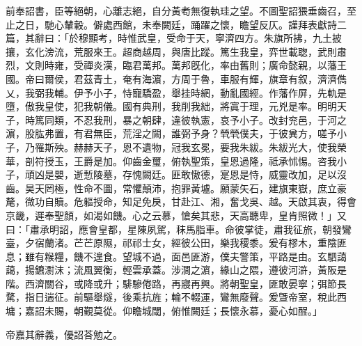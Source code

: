 \begin{pinyinscope}
前奉詔書，臣等絕朝，心離志絕，自分黃耇無復執珪之望。不圖聖詔猥垂齒召，至止之日，馳心輦轂。僻處西館，未奉闕廷，踊躍之懷，瞻望反仄。謹拜表獻詩二篇，其辭曰：「於穆顯考，時惟武皇，受命于天，寧濟四方。朱旗所拂，九土披攘，玄化滂流，荒服來王。超商越周，與唐比蹤。篤生我皇，弈世載聦，武則肅烈，文則時雍，受禪炎漢，臨君萬邦。萬邦旣化，率由舊則；廣命懿親，以藩王國。帝曰爾侯，君茲青土，奄有海濵，方周于魯，車服有輝，旗章有叙，濟濟儁乂，我弼我輔。伊予小子，恃寵驕盈，舉挂時網，動亂國經。作藩作屏，先軌是墮，傲我皇使，犯我朝儀。國有典刑，我削我絀，將寘于理，元兇是率。明明天子，時篤同類，不忍我刑，暴之朝肆，違彼執憲，哀予小子。改封兖邑，于河之濵，股肱弗置，有君無臣，荒淫之闕，誰弼予身？煢煢僕夫，于彼兾方，嗟予小子，乃罹斯殃。赫赫天子，恩不遺物，冠我玄冕，要我朱紱。朱紱光大，使我榮華，剖符授玉，王爵是加。仰齒金璽，俯執聖策，皇恩過隆，祗承怵惕。咨我小子，頑凶是嬰，逝慙陵墓，存愧闕廷。匪敢慠德，寔恩是恃，威靈改加，足以沒齒。昊天罔極，性命不圖，常懼顛沛，抱罪黃壚。願蒙矢石，建旗東嶽，庶立豪氂，微功自贖。危軀授命，知足免戾，甘赴江、湘，奮戈吳、越。天啟其衷，得會京畿，遲奉聖顏，如渴如饑。心之云慕，愴矣其悲，天高聽卑，皇肯照微！」又曰：「肅承明詔，應會皇都，星陳夙駕，秣馬脂車。命彼掌徒，肅我征旅，朝發鸞臺，夕宿蘭渚。芒芒原隰，祁祁士女，經彼公田，樂我稷黍。爰有樛木，重陰匪息；雖有糇糧，饑不遑食。望城不過，面邑匪游，僕夫警策，平路是由。玄駟藹藹，揚鑣㵱沫；流風翼衡，輕雲承蓋。涉澗之濵，緣山之隈，遵彼河滸，黃阪是階。西濟關谷，或降或升；騑驂倦路，再寢再興。將朝聖皇，匪敢晏寧；弭節長騖，指日遄征。前驅舉燧，後乘抗旌；輪不輟運，鸞無廢聲。爰曁帝室，稅此西墉；嘉詔未賜，朝覲莫從。仰瞻城閾，俯惟闕廷；長懷永慕，憂心如酲。」


帝嘉其辭義，優詔荅勉之。



\end{pinyinscope}
